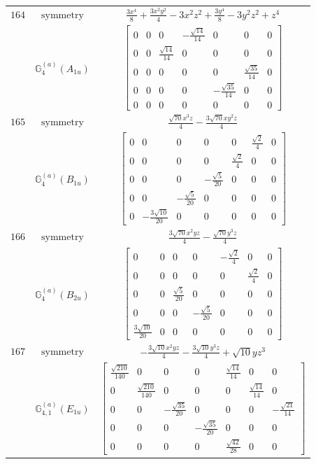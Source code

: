 \documentclass[fleqn,8pt,landscape]{jsarticle}
\begin{document}
\begin{longtable}{ccc}
$ 164 $ & $ \text{symmetry} $ & $ \frac{3 x^{4}}{8} + \frac{3 x^{2} y^{2}}{4} - 3 x^{2} z^{2} + \frac{3 y^{4}}{8} - 3 y^{2} z^{2} + z^{4} $ \\
$  $ & $ \mathbb{G}_{4}^{(a)}(A_{1u}) $ & $ \begin{bmatrix} 0 & 0 & 0 & - \frac{\sqrt{14}}{14} & 0 & 0 & 0 \\ 0 & 0 & \frac{\sqrt{14}}{14} & 0 & 0 & 0 & 0 \\ 0 & 0 & 0 & 0 & 0 & \frac{\sqrt{35}}{14} & 0 \\ 0 & 0 & 0 & 0 & - \frac{\sqrt{35}}{14} & 0 & 0 \\ 0 & 0 & 0 & 0 & 0 & 0 & 0 \end{bmatrix} $ \\ \hline
$ 165 $ & $ \text{symmetry} $ & $ \frac{\sqrt{70} x^{3} z}{4} - \frac{3 \sqrt{70} x y^{2} z}{4} $ \\
$  $ & $ \mathbb{G}_{4}^{(a)}(B_{1u}) $ & $ \begin{bmatrix} 0 & 0 & 0 & 0 & 0 & \frac{\sqrt{2}}{4} & 0 \\ 0 & 0 & 0 & 0 & \frac{\sqrt{2}}{4} & 0 & 0 \\ 0 & 0 & 0 & - \frac{\sqrt{5}}{20} & 0 & 0 & 0 \\ 0 & 0 & - \frac{\sqrt{5}}{20} & 0 & 0 & 0 & 0 \\ 0 & - \frac{3 \sqrt{10}}{20} & 0 & 0 & 0 & 0 & 0 \end{bmatrix} $ \\ \hline
$ 166 $ & $ \text{symmetry} $ & $ \frac{3 \sqrt{70} x^{2} y z}{4} - \frac{\sqrt{70} y^{3} z}{4} $ \\
$  $ & $ \mathbb{G}_{4}^{(a)}(B_{2u}) $ & $ \begin{bmatrix} 0 & 0 & 0 & 0 & - \frac{\sqrt{2}}{4} & 0 & 0 \\ 0 & 0 & 0 & 0 & 0 & \frac{\sqrt{2}}{4} & 0 \\ 0 & 0 & \frac{\sqrt{5}}{20} & 0 & 0 & 0 & 0 \\ 0 & 0 & 0 & - \frac{\sqrt{5}}{20} & 0 & 0 & 0 \\ \frac{3 \sqrt{10}}{20} & 0 & 0 & 0 & 0 & 0 & 0 \end{bmatrix} $ \\ \hline
$ 167 $ & $ \text{symmetry} $ & $ - \frac{3 \sqrt{10} x^{2} y z}{4} - \frac{3 \sqrt{10} y^{3} z}{4} + \sqrt{10} y z^{3} $ \\
$  $ & $ \mathbb{G}_{4,1}^{(a)}(E_{1u}) $ & $ \begin{bmatrix} \frac{\sqrt{210}}{140} & 0 & 0 & 0 & \frac{\sqrt{14}}{14} & 0 & 0 \\ 0 & \frac{\sqrt{210}}{140} & 0 & 0 & 0 & \frac{\sqrt{14}}{14} & 0 \\ 0 & 0 & - \frac{\sqrt{35}}{20} & 0 & 0 & 0 & - \frac{\sqrt{21}}{14} \\ 0 & 0 & 0 & - \frac{\sqrt{35}}{20} & 0 & 0 & 0 \\ 0 & 0 & 0 & 0 & \frac{\sqrt{42}}{28} & 0 & 0 \end{bmatrix} $ \\ \hline

\end{longtable}
\end{document}
